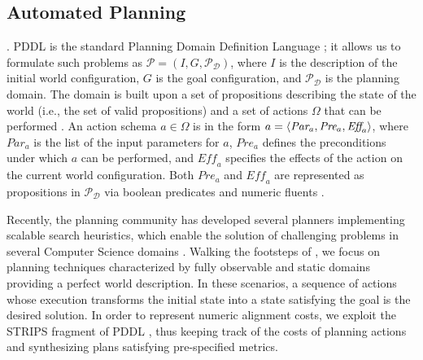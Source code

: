 
\subsection{Automated Planning}\label{ssec:ap}
 \cite{APlan}. PDDL is the standard Planning Domain Definition Language \cite{fox2003}; it allows us to formulate such problems as $\mathcal{P}=(I,G,\mathcal{P}_\mathcal{D})$, where $I$ is the description of the initial world configuration, $G$ is the goal configuration, and $\mathcal{P}_\mathcal{D}$ is the planning domain. The domain is built upon a set of propositions describing the state of the world (i.e., the set of valid propositions) and a set of actions $\Omega$ that can be performed . An action schema $a\in \Omega$ is in the form $a=\Braket{\textit{Par}_a,\textit{Pre}_a,\textit{Eff}_a}$, where $\textit{Par}_a$ is the list of the input parameters for $a$, $\textit{Pre}_a$ defines the preconditions under which $a$ can be performed, and $\textit{Eff}_a$ specifies the effects of the action on the current world configuration. Both $\textit{Pre}_a$ and $\textit{Eff}_a$ are represented as propositions in $\mathcal{P}_\mathcal{D}$ via boolean predicates and numeric fluents .

Recently, the planning community has developed several planners implementing scalable search heuristics, which enable the solution of challenging problems in several Computer Science domains \cite{Marrella17}. Walking  the footsteps of \cite{XuLZ17a}, we focus on planning techniques characterized by fully observable and static domains providing a perfect world description. In these scenarios, a sequence of actions whose execution transforms the initial state into a state satisfying the goal is the desired solution. In order to represent numeric alignment costs, we exploit the STRIPS fragment of PDDL , thus keeping track of the costs of planning actions and synthesizing plans satisfying pre-specified metrics.

